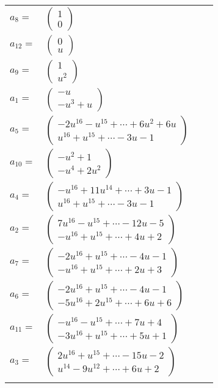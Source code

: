 \documentclass[1p]{elsarticle_modified}
\theoremstyle{definition}
\begin{document}
\begin{tabular}{m{7pt} m{180pt} m{7pt} m{180pt} }
\flushright $a_{8}=$&$\begin{pmatrix}1\\0\end{pmatrix}$ \\
\flushright $a_{12}=$&$\begin{pmatrix}0\\u\end{pmatrix}$ \\
\flushright $a_{9}=$&$\begin{pmatrix}1\\u^2\end{pmatrix}$ \\
\flushright $a_{1}=$&$\begin{pmatrix}- u\\- u^3+u\end{pmatrix}$ \\
\flushright $a_{5}=$&$\begin{pmatrix}-2 u^{16}- u^{15}+\cdots+6 u^2+6 u\\u^{16}+u^{15}+\cdots-3 u-1\end{pmatrix}$ \\
\flushright $a_{10}=$&$\begin{pmatrix}- u^2+1\\- u^4+2 u^2\end{pmatrix}$ \\
\flushright $a_{4}=$&$\begin{pmatrix}- u^{16}+11 u^{14}+\cdots+3 u-1\\u^{16}+u^{15}+\cdots-3 u-1\end{pmatrix}$ \\
\flushright $a_{2}=$&$\begin{pmatrix}7 u^{16}- u^{15}+\cdots-12 u-5\\- u^{16}+u^{15}+\cdots+4 u+2\end{pmatrix}$ \\
\flushright $a_{7}=$&$\begin{pmatrix}-2 u^{16}+u^{15}+\cdots-4 u-1\\- u^{16}+u^{15}+\cdots+2 u+3\end{pmatrix}$ \\
\flushright $a_{6}=$&$\begin{pmatrix}-2 u^{16}+u^{15}+\cdots-4 u-1\\-5 u^{16}+2 u^{15}+\cdots+6 u+6\end{pmatrix}$ \\
\flushright $a_{11}=$&$\begin{pmatrix}- u^{16}- u^{15}+\cdots+7 u+4\\-3 u^{16}+u^{15}+\cdots+5 u+1\end{pmatrix}$ \\
\flushright $a_{3}=$&$\begin{pmatrix}2 u^{16}+u^{15}+\cdots-15 u-2\\u^{14}-9 u^{12}+\cdots+6 u+2\end{pmatrix}$\\&\end{tabular}
\end{document}
